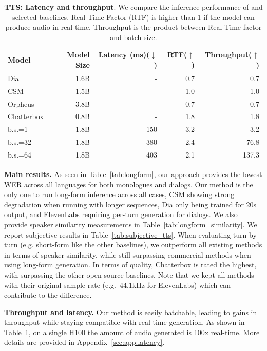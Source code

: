 \documentclass{article}
\begin{document}
\begin{table}[t]
\centering
\tiny
\caption{\textbf{TTS: Latency and throughput}.
We compare the inference performance of \oursTTS{} and selected baselines.
Real-Time Factor (RTF) is higher than 1 if the model can produce audio in real time.
Throughput is the product between Real-Time-factor and batch size.
}
\label{tab:latency}
\begin{sc}
\begin{tabular}{l|r|rrr}
\toprule
\textbf{Model} & \textbf{Model Size} & \textbf{Latency} (ms)($\downarrow$)  & \textbf{RTF}($\uparrow$)  & \textbf{Throughput}($\uparrow$) \\
\midrule
Dia & 1.6B & - &  0.7 & 0.7 \\
CSM & 1.5B &- & 1.0 & 1.0 \\
Orpheus & 3.8B & - & 0.7 & 0.7 \\
Chatterbox & 0.8B & - & 1.8 & 1.8 \\
\oursTTS{} b.s.=1  & 1.8B & 150 & 3.2 & 3.2 \\
\oursTTS{} b.s.=32 & 1.8B & 380 & 2.4 & 76.8 \\
\oursTTS{} b.s.=64 & 1.8B & 403 & 2.1 & 137.3 \\
\bottomrule
\end{tabular}
\end{sc}
\end{table}

\textbf{Main results.} As seen in Table~\ref{tab:longform}, our approach provides the
lowest WER across all languages for both monologues and dialogs. Our method is the only one to run long-form inference across all cases, CSM showing strong degradation when running with longer sequences, Dia only being trained for 20s output, and ElevenLabs requiring per-turn generation for dialogs. We also provide speaker similarity measurements in Table~\ref{tab:longform_similarity}.
We report subjective results in Table~\ref{tab:subjective_tts}.
When evaluating turn-by-turn (e.g. short-form like the other baselines), we outperform all existing methods in terms of speaker similarity, while still surpassing commercial methods when using long-form generation.
In terms of quality, Chatterbox is rated the highest, with \oursTTS{} surpassing the other open source baselines. 
Note that we kept all methods with their original sample rate (e.g.\ 44.1kHz for ElevenLabs) which can contribute to the difference.

\textbf{Throughput and latency.} Our method is easily batchable, leading to gains in throughput while staying compatible with real-time generation. As shown in Table~\ref{tab:latency}, on a single H100 the amount of audio generated is 100x real-time. More details are provided in Appendix~\ref{sec:app:latency}. 
\end{document}
